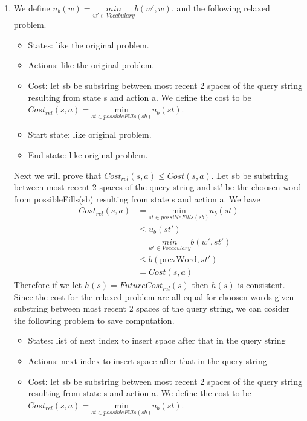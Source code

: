 \documentclass[12pt]{article}
\begin{document}
\begin{enumerate}[label=(\alph*)]
    \item
    We define $u_b(w) = \underset{w' \in Vocabulary}{min}b(w', w)$, and the following relaxed problem. \\
    \begin{itemize}
    \item States: like the original problem. \\
    \item Actions: like the original problem. \\
    \item Cost: let sb be substring between most recent 2 spaces of the query string resulting from state s and action a. We define the cost to be $Cost_{rel}(s, a) = \underset{st \in possibleFills(sb)}{\text{min}}u_b(st)$. \\
    \item Start state: like original problem. \\
    \item End state: like original problem.
    \end{itemize}
    Next we will prove that $Cost_{rel}(s, a) \leq Cost(s, a)$. Let sb be substring between most recent 2 spaces of the query string and st' be the choosen word from possibleFills(sb) resulting from state s and action a. We have
    \begin{align*}
    	Cost_{rel}(s, a) &= \underset{st \in possibleFills(sb)}{\text{min}}u_b(st) \\
    	&\leq u_b(st') \\
    	&= \underset{w' \in Vocabulary}{min}b(w', st') \\
    	&\leq b(\text{prevWord}, st') \\
    	&= Cost(s, a) 
    \end{align*}
    Therefore if we let $h(s) = FutureCost_{rel}(s)$ then $h(s)$ is consistent. Since the cost for the relaxed problem are all equal for choosen words given substring between most recent 2 spaces of the query string, we can cosider the following problem to save computation. 
    \begin{itemize}
    \item States: list of next index to insert space after that in the query string \\
    \item Actions: next index to insert space after that in the query string \\
    \item Cost: let sb be substring between most recent 2 spaces of the query string resulting from state s and action a. We define the cost to be $Cost_{rel}(s, a) = \underset{st \in possibleFills(sb)}{\text{min}}u_b(st)$. \\

\end{itemize}
\end{enumerate}
\end{document}
